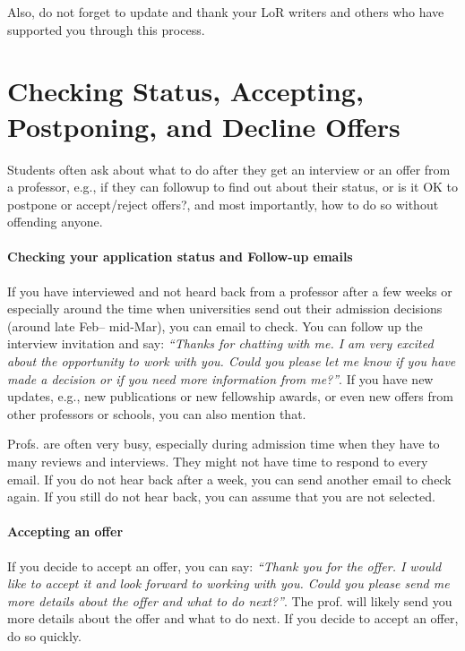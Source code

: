 \documentclass[oneside,11pt,dvipsnames]{book}
\begin{document}
Also, do not forget to update and thank your LoR writers and others who have supported you through this process.


\section{Checking Status, Accepting, Postponing, and Decline Offers}\label{sec:accept-postpone-decline}

Students often ask about what to do after they get an interview or an offer from a professor, e.g., if they can followup to find out about their status, or is it OK to postpone or accept/reject offers?, and most importantly, how to do so without offending anyone. 

\paragraph{Checking your application status and Follow-up emails} If you have interviewed and not heard back from a professor after a few weeks or especially around the time when universities send out their admission decisions (around late Feb-- mid-Mar), you can email to check.  You can follow up the interview invitation and say: \emph{``Thanks for chatting with me. I am very excited about the opportunity to work with you.  Could you please let me know if you have made a decision or if you need more information from me?''}.  If you have new updates, e.g., new publications or new fellowship awards, or even new offers from other professors or schools, you can also mention that.

Profs. are often very busy, especially during admission time when they have to many reviews and interviews.  They might not have time to respond to every email.  If you do not hear back after a week, you can send another email to check again.  If you still do not hear back, you can assume that you are not selected.

\paragraph{Accepting an offer} If you decide to accept an offer, you can say: \emph{``Thank you for the offer.  I would like to accept it and look forward to working with you.  Could you please send me more details about the offer and what to do next?''}. The prof. will likely send you more details about the offer and what to do next.  If you decide to accept an offer, do so quickly.
\end{document}
